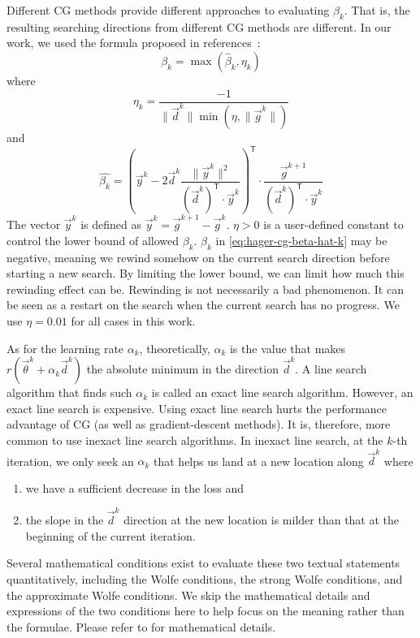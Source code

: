 Different CG methods provide different approaches to evaluating $\beta_k$.
That is, the resulting searching directions from different CG methods are different.
In our work, we used the formula proposed in references~\cite{hager_new_2005,hager_algorithm_2006}:
\begin{equation}\label{eq:hager-cg-beta}
    \beta_k = \max\left(\hat{\beta}_k, \eta_k\right)
\end{equation}
where
\begin{equation}\label{eq:hager-cg-etak}
    \eta_k = \frac{-1}{\lVert\vec{d}^k\rVert \min \left(\eta, \lVert\vec{g}^k\rVert\right)}
\end{equation}
and
\begin{equation}\label{eq:hager-cg-beta-hat-k}
    \hat{\beta_k} = \left(
        \vec{y}^k -
        2\vec{d}^k
        \frac{\lVert\vec{y}^k\rVert^2}{\left(\vec{d}^k\right)^\mathsf{T}\cdot \vec{y}^k}
    \right)^\mathsf{T}
    \cdot 
    \frac{\vec{g}^{k+1}}{\left(\vec{d}^k\right)^\mathsf{T}\cdot\vec{y}^k}
\end{equation}
The vector $\vec{y}^k$ is defined as $\vec{y}^k=\vec{g}^{k+1}-\vec{g}^k$.
$\eta > 0$ is a user-defined constant to control the lower bound of allowed $\beta_k$.
$\hat{\beta_k}$ in \eqref{eq:hager-cg-beta-hat-k} may be negative, meaning we rewind somehow on the current search direction before starting a new search.
By limiting the lower bound, we can limit how much this rewinding effect can be.
Rewinding is not necessarily a bad phenomenon.
It can be seen as a restart on the search when the current search has no progress.
We use $\eta=0.01$ for all cases in this work.

As for the learning rate $\alpha_k$, theoretically, $\alpha_k$ is the value that makes $r(\vec{\theta}^k+\alpha_k\vec{d}^k)$ the absolute minimum in the direction $\vec{d}^k$.
A line search algorithm that finds such $\alpha_k$ is called an exact line search algorithm.
However, an exact line search is expensive.
Using exact line search hurts the performance advantage of CG (as well as gradient-descent methods).
It is, therefore, more common to use inexact line search algorithms.
In inexact line search, at the $k$-th iteration, we only seek an $\alpha_k$ that helps us land at a new location along $\vec{d}^k$ where
\begin{enumerate}[noitemsep,topsep=-12pt]
    \item we have a sufficient decrease in the loss and
    \item the slope in the $\vec{d}^k$ direction at the new location is milder than that at the beginning of the current iteration.
\end{enumerate}
Several mathematical conditions exist to evaluate these two textual statements quantitatively, including the Wolfe conditions, the strong Wolfe conditions, and the approximate Wolfe conditions.
We skip the mathematical details and expressions of the two conditions here to help focus on the meaning rather than the formulae.
Please refer to \cite[Chapter~3]{nocedal_numerical_2006} for mathematical details.

